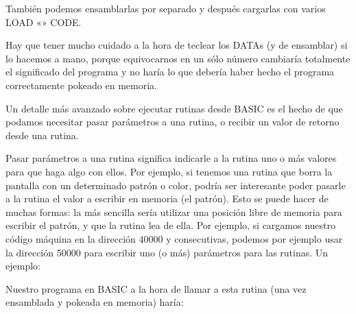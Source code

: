\documentclass[letterpaper,10pt,spanish]{sphinxmanual}
\begin{document}
También podemos ensamblarlas por separado y después cargarlas con varios LOAD «» CODE.

Hay que tener mucho cuidado a la hora de teclear los DATAs (y de ensamblar) si lo hacemos a mano, porque equivocarnos en un sólo número cambiaría totalmente el significado del programa y no haría lo que debería haber hecho el programa correctamente pokeado en memoria.

Un detalle más avanzado sobre ejecutar rutinas desde BASIC es el hecho de que podamos necesitar pasar parámetros a una rutina, o recibir un valor de retorno desde una rutina.

Pasar parámetros a una rutina significa indicarle a la rutina uno o más valores para que haga algo con ellos. Por ejemplo, si tenemos una rutina que borra la pantalla con un determinado patrón o color, podría ser interesante poder pasarle a la rutina el valor a escribir en memoria (el patrón). Esto se puede hacer de muchas formas: la más sencilla sería utilizar una posición libre de memoria para escribir el patrón, y que la rutina lea de ella. Por ejemplo, si cargamos nuestro código máquina en la dirección 40000 y consecutivas, podemos por ejemplo usar la dirección 50000 para escribir uno (o más) parámetros para las rutinas. Un ejemplo:

\begin{sphinxVerbatim}[commandchars=\\\{\}]
 

  

  
  
  
  
\end{sphinxVerbatim}

Nuestro programa en BASIC a la hora de llamar a esta rutina (una vez ensamblada y pokeada en memoria) haría:
\end{document}
